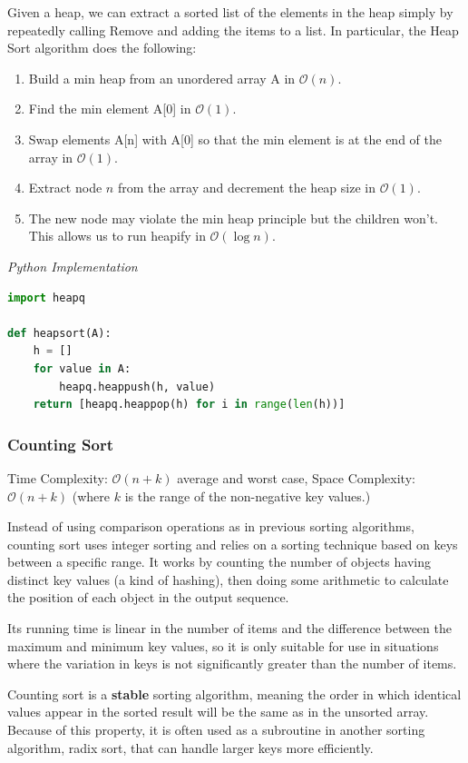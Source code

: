\documentclass{article}
\newcommand{\bigO}{\mathcal{O}}
\begin{document}
    Given a heap, we can extract a sorted list of the elements in the heap simply by repeatedly calling Remove and adding the items to a list. In particular, the Heap Sort algorithm does the following: 
    \begin{enumerate}
        \item Build a min heap from an unordered array A in $\bigO(n)$.
        \item Find the min element A[0] in $\bigO(1)$.
        \item Swap elements A[n] with A[0] so that the min element is at the end of the array in $\bigO(1)$.
        \item Extract node $n$ from the array and decrement the heap size in $\bigO(1)$.
        \item The new node may violate the min heap principle but the children won't. This allows us to run heapify in $\bigO(\log n)$.
    \end{enumerate}
    
\vspace{8pt} \emph{Python Implementation}
\begin{lstlisting}[language=Python]
import heapq

def heapsort(A):
    h = []
    for value in A:
        heapq.heappush(h, value)
    return [heapq.heappop(h) for i in range(len(h))]
\end{lstlisting}

    \subsubsection{Counting Sort}
    Time Complexity: $\bigO(n + k)$ average and worst case, Space Complexity: $\bigO(n + k)$ (where $k$ is the range of the non-negative key values.)
    
    Instead of using comparison operations as in previous sorting algorithms, counting sort uses integer sorting and relies on a sorting technique based on keys between a specific range. It works by counting the number of objects having distinct key values (a kind of hashing), then doing some arithmetic to calculate the position of each object in the output sequence.
    
    Its running time is linear in the number of items and the difference between the maximum and minimum key values, so it is only suitable for use in situations where the variation in keys is not significantly greater than the number of items. 
    
    
     Counting sort is a \textbf{stable} sorting algorithm, meaning the order in which identical values appear in the sorted result will be the same as in the unsorted array. Because of this property, it is often used as a subroutine in another sorting algorithm, radix sort, that can handle larger keys more efficiently.
   
\end{document}
